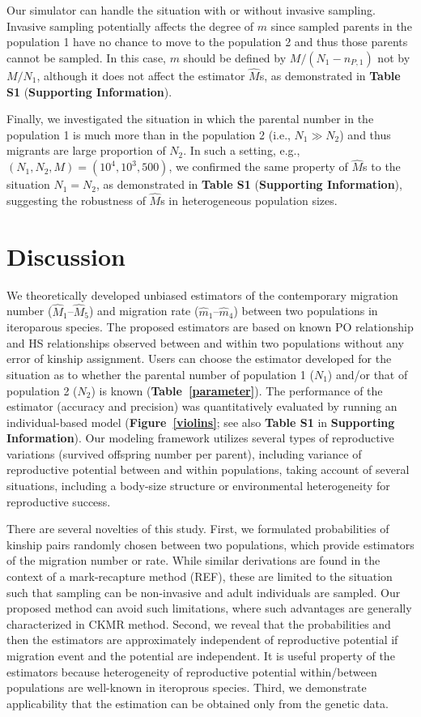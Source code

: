 \documentclass[12pt, English]{article}
\begin{document}
\begin{spacing}{1.9}
Our simulator can handle the situation with or without invasive sampling. Invasive sampling potentially affects the degree of $m$ since sampled parents in the population 1 have no chance to move to the population 2 and thus those parents cannot be sampled. In this case, $m$ should be defined by $M/(N_1-n_{P,1})$ not by $M/N_1$, although it does not affect the estimator ${\hat M}$s, as demonstrated in {\bf Table S1} ({\bf Supporting Information}). 

Finally, we investigated the situation in which the parental number in the population 1 is much more than in the population 2 (i.e., $N_1 \gg N_2$) and thus migrants are large proportion of $N_2$. In such a setting, e.g., $(N_1,N_2,M)=(10^4,10^3,500)$, we confirmed the same property of ${\hat M}$s to the situation $N_1 = N_2$, as demonstrated in {\bf Table S1} ({\bf Supporting Information}), suggesting the robustness of ${\hat M}$s in heterogeneous population sizes.   

\section{Discussion}\label{sec4}

We theoretically developed unbiased estimators of the contemporary migration number (${\hat M_1}$--${\hat M_5}$) and migration rate (${\hat m_1}$--${\hat m_4}$) between two populations in iteroparous species. The proposed estimators are based on known PO relationship and HS relationships observed between and within two populations without any error of kinship assignment. Users can choose the estimator developed for the situation as to whether the parental number of population 1 ($N_1$) and/or that of population 2 ($N_2$) is known ({\bf Table~\ref{parameter}}). The performance of the estimator (accuracy and precision) was quantitatively evaluated by running an individual-based model ({\bf Figure~\ref{violins}}; see also {\bf Table S1} in {\bf Supporting Information}). Our modeling framework utilizes several types of reproductive variations (survived offspring number per parent), including variance of reproductive potential between and within populations, taking account of several situations, including a body-size structure or environmental heterogeneity for reproductive success.

There are several novelties of this study. First, we formulated probabilities of kinship pairs randomly chosen between two populations, which provide estimators of the migration number or rate. While similar derivations are found in the context of a mark-recapture method (REF), these are limited to the situation such that sampling can be non-invasive and adult individuals are sampled. Our proposed method can avoid such limitations, where such advantages are generally characterized in CKMR method. Second, we reveal that the probabilities and then the estimators are approximately independent of reproductive potential if migration event and the potential are independent. It is useful property of the estimators because heterogeneity of reproductive potential within/between populations are well-known in iteroprous species. Third, we demonstrate applicability that the estimation can be obtained only from the genetic data. 


\end{spacing}
\end{document}
